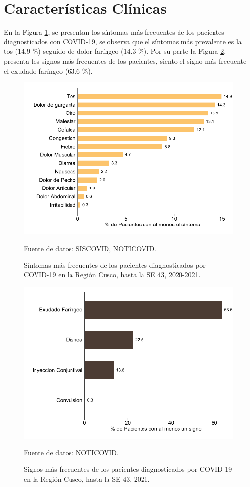 \documentclass[12pt,a4paper,openany]{book}
\begin{document}
\cleardoublepage


\clearpage

\section*{Características Clínicas}


\noindent En la Figura \ref{fig:sintomas}, se presentan los síntomas más frecuentes de los pacientes diagnosticados con COVID-19, se observa que el síntomas más prevalente es la tos (14.9 $\%$) seguido de dolor faríngeo (14.3 $\%$). Por su parte la Figura \ref{fig:signos}, presenta los signos más frecuentes de los pacientes, siento el signo más frecuente el exudado faríngeo (63.6 $\%$).

\begin{figure}[h]
	\caption{Síntomas más frecuentes de los pacientes diagnosticados por COVID-19 en la Región Cusco, hasta la SE 43, 2020-2021.  }\label{fig:sintomas}
	\begin{center}
		\includegraphics[width=0.65\linewidth]{../figuras/figura_sintoma.pdf}
	\end{center}
	{\footnotesize {Fuente de datos: SISCOVID, NOTICOVID.}}
\end{figure}

\begin{figure}[h]
	\caption{Signos más frecuentes de los pacientes diagnosticados por COVID-19 en la Región Cusco, hasta la SE 43, 2021.}\label{fig:signos}
	\begin{center}
		\includegraphics[width=0.65\linewidth]{../figuras/figura_signo.pdf}
	\end{center}
	{\footnotesize {Fuente de datos: NOTICOVID.}}
\end{figure}
\end{document}
